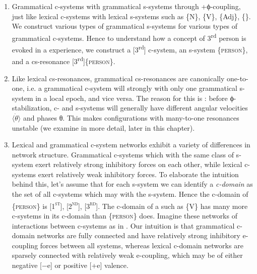 \begin{enumerate}\sloppy

\item Grammatical c-systems  with grammatical s-systems through +ϕ-coupling, just like lexical c-systems  with lexical s-systems such as \{N\}, \{V\}, \{Adj\}, \{\}. We construct various types of grammatical s-systems for various types of grammatical c-systems. Hence to understand how a concept of 3\textsuperscript{rd} person is evoked in a  experience, we construct a [3\textsuperscript{rd}] c-system, an s-system \{\textsc{person}\}, and a cs-resonance [3\textsuperscript{rd}]\{\textsc{person}\}. 

\item Like lexical cs-resonances, grammatical cs-resonances are canonically one-to-one, i.e. a grammatical c-system will strongly  with only one grammatical s-system in a local epoch, and vice versa. The reason for this is : before ϕ-stabilization, c- and s-systems will generally have different angular velocities $\langle\dot{\theta}\rangle$ and phases θ. This makes configurations with many-to-one resonances unstable (we examine  in more detail, later in this chapter).

\item Lexical and grammatical c-system networks exhibit a variety of differences in network structure. Grammatical c-systems which  with the same class of s-system exert relatively strong inhibitory forces on each other, while lexical c-systems exert relatively weak inhibitory forces. To elaborate the intuition behind this, let's assume that for each s-system we can identify a \textit{c-domain} as the set of all c-systems which may  with the s-system. Hence the c-domain of \{\textsc{person}\} is [1\textsc{\textsuperscript{st}}], [2\textsc{\textsuperscript{nd}}], [3\textsc{\textsuperscript{rd}}]. The c-domain of a  such as \{V\} has many more c-systems in its c-domain than \{\textsc{person}\} does. Imagine these networks of interactions between c-systems as in {}. Our intuition is that grammatical c-domain networks are fully connected and have relatively strong inhibitory e-coupling forces between all systems, whereas lexical c-domain networks are sparsely connected with relatively weak e-coupling, which may be of either negative [−e] or positive [+e] valence.


\end{enumerate}
